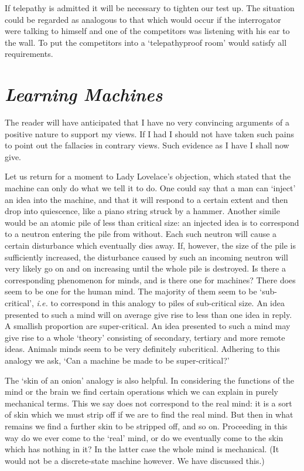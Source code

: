 \documentclass[12pt]{article}
\begin{document}
    If telepathy is admitted it will be necessary to tighten our test up. The situation could be regarded as analogous to that which would occur if the interrogator were talking to himself and one of the competitors was listening with his ear to the wall. To put the competitors into a ‘telepathyproof room' would satisfy all requirements.

    \section{\textit{Learning Machines}}
    The reader will have anticipated that I have no very convincing arguments of a positive nature to support my views. If I had I should not have taken such pains to point out the fallacies in contrary views. Such evidence as I have I shall now give.

    Let us return for a moment to Lady Lovelace's objection, which stated that the machine can only do what we tell it to do. One could say that a man can ‘inject' an idea into the machine, and that it will respond to a certain extent and then drop into quiescence, like a piano string struck by a hammer. Another simile would be an atomic pile of less than critical size: an injected idea is to correspond to a neutron entering the pile from without. Each such neutron will cause a certain disturbance which eventually dies away. If, however, the size of the pile is sufficiently increased, the disturbance caused by such an incoming neutron will very likely go on and on increasing until the whole pile is destroyed. Is there a corresponding phenomenon for minds, and is there one for machines? There does seem to be one for the human mind. The majority of them seem to be ‘sub-critical', \textit{i.e.} to correspond in this analogy to piles of sub-critical size. An idea presented to such a mind will on average give rise to less than one idea in reply. A smallish proportion are super-critical. An idea presented to such a mind may give rise to a whole ‘theory' consisting of secondary, tertiary and more remote ideas. Animals minds seem to be very definitely subcritical. Adhering to this analogy we ask, ‘Can a machine be made to be super-critical?'

    The ‘skin of an onion' analogy is also helpful. In considering the functions of the mind or the brain we find certain operations which we can explain in purely mechanical terms. This we say does not correspond to the real mind: it is a sort of skin which we must strip off if we are to find the real mind. But then in what remains we find a further skin to be stripped off, and so on. Proceeding in this way do we ever come to the ‘real' mind, or do we eventually come to the skin which has nothing in it? In the latter case the whole mind is mechanical. (It would not be a discrete-state machine however. We have discussed this.)
\end{document}
